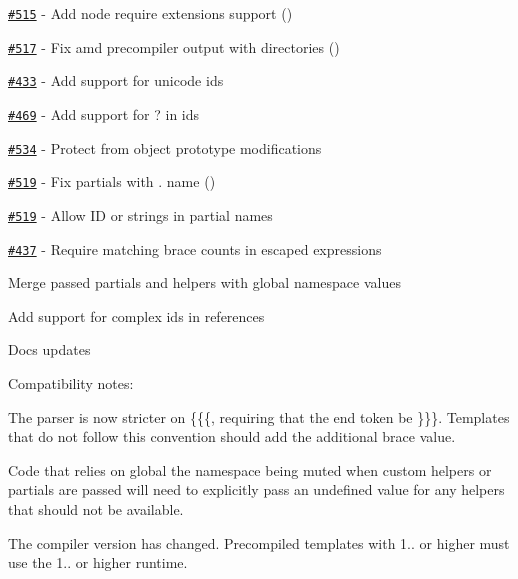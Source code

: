 \begin{DoxyItemize}
\item \href{https://github.com/wycats/handlebars.js/issues/515}{\tt \#515} -\/ Add node require extensions support (\href{https://github.com/jjclark1982}{\tt })
\item \href{https://github.com/wycats/handlebars.js/issues/517}{\tt \#517} -\/ Fix amd precompiler output with directories (\href{https://github.com/blessenm}{\tt })
\item \href{https://github.com/wycats/handlebars.js/issues/433}{\tt \#433} -\/ Add support for unicode ids
\item \href{https://github.com/wycats/handlebars.js/issues/469}{\tt \#469} -\/ Add support for {\ttfamily ?} in ids
\item \href{https://github.com/wycats/handlebars.js/issues/534}{\tt \#534} -\/ Protect from object prototype modifications
\item \href{https://github.com/wycats/handlebars.js/issues/519}{\tt \#519} -\/ Fix partials with . name (\href{https://github.com/jamesgorrie}{\tt })
\item \href{https://github.com/wycats/handlebars.js/issues/519}{\tt \#519} -\/ Allow I\+D or strings in partial names
\item \href{https://github.com/wycats/handlebars.js/issues/437}{\tt \#437} -\/ Require matching brace counts in escaped expressions
\item Merge passed partials and helpers with global namespace values
\item Add support for complex ids in  references
\item Docs updates
\end{DoxyItemize}

Compatibility notes\+:
\begin{DoxyItemize}
\item The parser is now stricter on {\ttfamily \{\{\{}, requiring that the end token be {\ttfamily \}\}\}}. Templates that do not follow this convention should add the additional brace value.
\item Code that relies on global the namespace being muted when custom helpers or partials are passed will need to explicitly pass an {\ttfamily undefined} value for any helpers that should not be available.
\item The compiler version has changed. Precompiled templates with 1.. or higher must use the 1.. or higher runtime.
\end{DoxyItemize}

